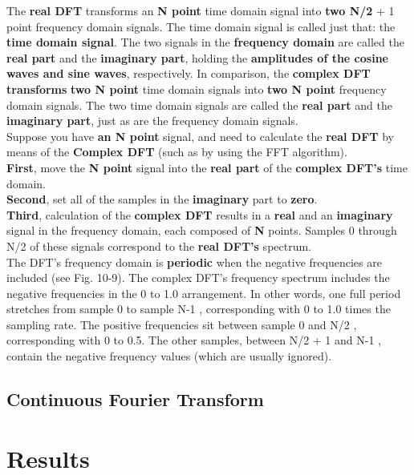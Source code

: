 \documentclass[a4paper,12pt]{article}
\begin{document}
The \textbf{real DFT} transforms an \textbf{N point} time domain signal into 
\textbf{two N/2} + 1 point frequency domain signals. The time domain
signal is called just that: the \textbf{time domain signal}. The two signals in the
\textbf{frequency domain} are called the \textbf{real part} and the \textbf{imaginary part},
holding the \textbf{amplitudes of the cosine waves and sine waves}, respectively.
In comparison, the \textbf{complex DFT transforms} \textbf{two N point} time domain signals
into \textbf{two N point} frequency domain signals. The two time domain signals are
called the \textbf{real part} and the \textbf{imaginary part}, just as are the frequency domain
signals. 
\\Suppose you have \textbf{an N point} signal, and need to calculate the \textbf{real DFT} by
means of the \textbf{Complex DFT} (such as by using the FFT algorithm).\\
\textbf{First}, move the \textbf{N point} signal into the \textbf{real part} of the \textbf{complex DFT's} time domain.\\
\textbf{Second}, set all of the samples in the \textbf{imaginary} part to \textbf{zero}.\\
\textbf{Third}, calculation of the \textbf{complex DFT} results in a \textbf{real} and an \textbf{imaginary} signal in the frequency domain, each composed of \textbf{N} points. 
Samples 0 through N/2 of these signals correspond to the \textbf{real DFT's} spectrum.\\
The DFT's frequency domain is \textbf{periodic} when the negative frequencies are included (see Fig. 10-9). 
The complex DFT's frequency spectrum includes the negative frequencies in the 0
to 1.0 arrangement. In other words, one full period stretches from sample 0 to
sample N-1 , corresponding with 0 to 1.0 times the sampling rate. The positive
frequencies sit between sample 0 and N/2 , corresponding with 0 to 0.5. The
other samples, between N/2 + 1 and N-1 , contain the negative frequency
values (which are usually ignored). \cite{smith1997dspbook}

\subsection{Continuous Fourier Transform}


\section{Results}
\end{document}
